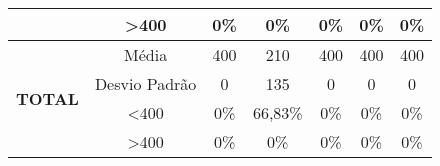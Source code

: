 \begin{table}[H]
\begin{tabular}{|c|c|ccccc|}
                                & \textgreater 400 & 0\%            & 0\%            & 0\%            & 0\%            & 0\%            \\ \hline
\multirow{4}{*}{\textbf{TOTAL}} & Média            & 400               & 210               & 400               & 400               & 400               \\
                                & Desvio Padrão    & 0                 & 135               & 0                 & 0                 & 0                 \\
                                & \textless 400    & 0\%            & 66,83\%           & 0\%            & 0\%            & 0\%            \\
                                & \textgreater 400 & 0\%            & 0\%            & 0\%            & 0\%            & 0\%            \\ \hline
\end{tabular}
\end{table}
